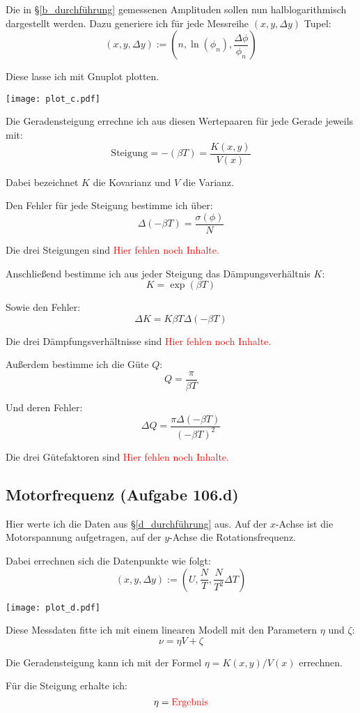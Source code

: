 \documentclass[11pt]{article}
\newcommand{\ergebnis}{\textcolor{red}{\mathrm{Ergebnis}}}
\newcommand{\fehlt}{\textcolor{red}{Hier fehlen noch Inhalte.}}
\begin{document}
Die in §\ref{b_durchführung} gemessenen Amplituden sollen nun halblogarithmisch
dargestellt werden. Dazu generiere ich für jede Messreihe $(x, y, \Delta y)$
Tupel:
\[ (x, y, \Delta y) := \left(n, \ln(\phi_n), \frac{\Delta \phi}{\phi_n}\right) \]

Diese lasse ich mit Gnuplot plotten.

\texttt{[image: plot\_c.pdf]}

Die Geradensteigung errechne ich aus diesen Wertepaaren für jede Gerade jeweils
mit:
\[ \mathrm{Steigung} = -(\beta T) = \frac{K(x, y)}{V(x)} \]

Dabei bezeichnet $K$ die Kovarianz und $V$ die Varianz.

Den Fehler für jede Steigung bestimme ich über:
\[ \Delta (-\beta T) = \frac{\sigma(\phi)}{N} \]

Die drei Steigungen sind \fehlt

Anschließend bestimme ich aus jeder Steigung das Dämpungsverhältnis $K$:
\[ K = \exp(\beta T) \]

Sowie den Fehler:
\[ \Delta K = K \beta T \Delta (-\beta T) \]

Die drei Dämpfungsverhältnisse sind \fehlt

Außerdem bestimme ich die Güte $Q$:
\[ Q = \frac{\pi}{\beta T} \]

Und deren Fehler:
\[ \Delta Q = \frac{\pi \Delta (-\beta T)}{(-\beta T)^2} \]

Die drei Gütefaktoren sind \fehlt

\subsection{Motorfrequenz (Aufgabe 106.d)}
\label{d_auswertung}

Hier werte ich die Daten aus §\ref{d_durchführung} aus. Auf der $x$-Achse ist
die Motorspannung aufgetragen, auf der $y$-Achse die Rotationsfrequenz.

Dabei errechnen sich die Datenpunkte wie folgt:
\[ (x, y, \Delta y) := \left( U, \frac N T, \frac{N}{T^2} \Delta T \right) \]

\texttt{[image: plot\_d.pdf]}

Diese Messdaten fitte ich mit einem linearen Modell mit den Parametern $\eta$
und $\zeta$:
\[ \nu = \eta V + \zeta \]

Die Geradensteigung kann ich mit der Formel $\eta = K(x, y)/V(x)$ errechnen.

Für die Steigung erhalte ich:
\[ \eta = \ergebnis \]
\end{document}
